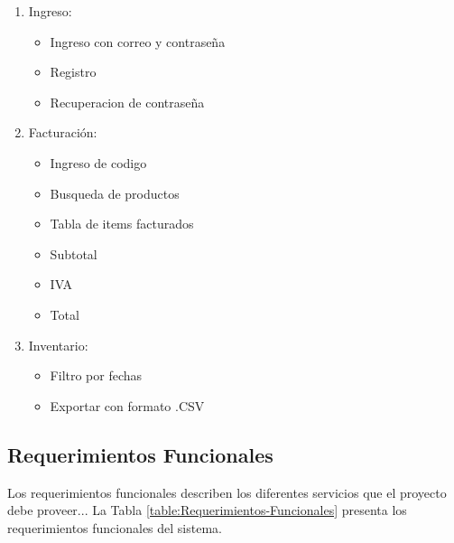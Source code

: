 \begin{enumerate}

\item Ingreso:
\begin{itemize}
    \item Ingreso con correo y contraseña
    \item Registro
    \item Recuperacion de contraseña
\end{itemize}

\item Facturación:
\begin{itemize}
    \item Ingreso de codigo
    \item Busqueda de productos
    \item Tabla de items facturados
    \item Subtotal
    \item IVA
    \item Total
\end{itemize}

\item Inventario:
\begin{itemize}
    \item Filtro por fechas
    \item Exportar con formato .CSV
\end{itemize}

\end{enumerate} 

\subsection{Requerimientos Funcionales}
Los requerimientos funcionales describen los diferentes servicios que el proyecto debe proveer... La Tabla \ref{table:Requerimientos-Funcionales} presenta los requerimientos funcionales del sistema.

